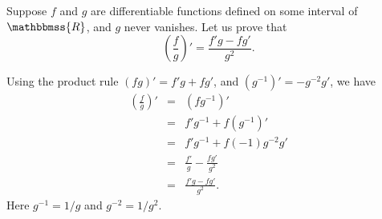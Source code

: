 \documentclass[12pt]{article}
\newcommand{\R}{\mathbbmss{R}}
\begin{document}
Suppose $f$ and $g$ are differentiable functions defined on some interval
of $\R$, and $g$ never vanishes. Let us prove that 
$$
\left( \frac{f}{g}\right)' = \frac{ f' g - f g'}{g^2}.
$$

Using the product rule $(fg)'=f'g + fg'$, and $(g^{-1})'=-g^{-2}g'$, 
we have
\begin{eqnarray*}
 \left( \frac{f}{g}\right)' &=& (f g^{-1})' \\
           &=& f' g^{-1} + f (g^{-1})' \\
           &=& f' g^{-1} + f (-1) g^{-2} g'\\ 
           &=& \frac{f'}{g} - \frac{fg'}{g^2} \\
           &=& \frac{f'g- fg'}{g^2}. 
\end{eqnarray*}
Here $g^{-1}=1/g$ and $g^{-2}=1/g^2$.
\end{document}
